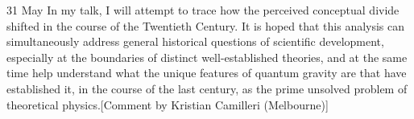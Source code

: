 \documentclass{conference}
\begin{document}
\begin{Day}{31 May}
{In my talk, I will attempt to trace how the perceived conceptual divide shifted in the course of the Twentieth Century. It is hoped that this analysis can simultaneously address general historical questions of scientific development, especially at the boundaries of distinct well-established theories, and at the same time help understand what the unique features of quantum gravity are that have established it, in the course of the last century, as the prime unsolved problem of theoretical physics.}[Comment by Kristian Camilleri (Melbourne)]

\end{Day}

\vfill

\pagebreak
 

\vspace*{1in}
\end{document}

